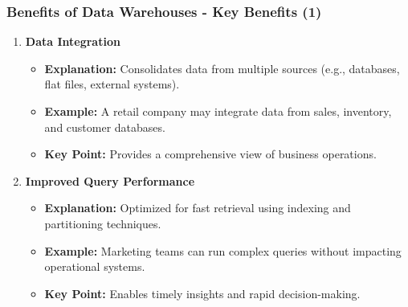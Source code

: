 \documentclass[aspectratio=169]{beamer}
\begin{document}
\begin{frame}[fragile]
    \frametitle{Benefits of Data Warehouses - Key Benefits (1)}
    \begin{enumerate}
        \item \textbf{Data Integration}
            \begin{itemize}
                \item \textbf{Explanation:} Consolidates data from multiple sources (e.g., databases, flat files, external systems).
                \item \textbf{Example:} A retail company may integrate data from sales, inventory, and customer databases.
                \item \textbf{Key Point:} Provides a comprehensive view of business operations.
            \end{itemize}
    
        \item \textbf{Improved Query Performance}
            \begin{itemize}
                \item \textbf{Explanation:} Optimized for fast retrieval using indexing and partitioning techniques.
                \item \textbf{Example:} Marketing teams can run complex queries without impacting operational systems.
                \item \textbf{Key Point:} Enables timely insights and rapid decision-making.
            \end{itemize}
    \end{enumerate}
\end{frame}
\end{document}
